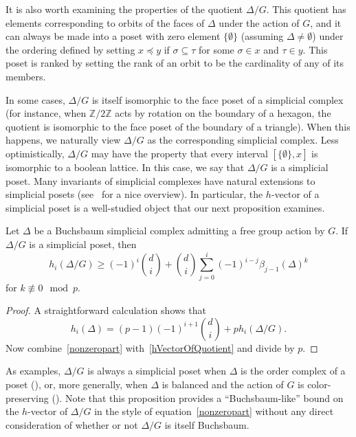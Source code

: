 \documentclass[ALCO,ThmDefs,Unicode]{cedram}
\newcommand{\ZZ}{{\mathbb Z}}
\begin{document}
It is also worth examining the properties of the quotient $\Delta/G$. This quotient has elements corresponding to orbits of the faces of $\Delta$ under the action of $G$, and it can always be made into a poset with zero element $\{\emptyset\}$ (assuming $\Delta\not=\emptyset$) under the ordering defined by setting $x\preceq y$ if $\sigma\subseteq \tau$ for some $\sigma\in x$ and $\tau\in y$. This poset is ranked by setting the rank of an orbit to be the cardinality of any of its members.

In some cases, $\Delta/G$ is itself isomorphic to the face poset of a simplicial complex (for instance, when $\ZZ/2\ZZ$ acts by rotation on the boundary of a hexagon, the quotient is isomorphic to the face poset of the boundary of a triangle). When this happens, we naturally view $\Delta/G$ as the corresponding simplicial complex. Less optimistically, $\Delta/G$ may have the property that every interval $[\{\emptyset\}, x]$ is isomorphic to a boolean lattice. In this case, we say that $\Delta/G$ is a simplicial poset. Many invariants of simplicial complexes have natural extensions to simplicial posets (see~\cite{StanleyPosets} for a nice overview). In particular, the $h$-vector of a simplicial poset is a well-studied object that our next proposition examines.

\begin{prop}
Let $\Delta$ be a Buchsbaum simplicial complex admitting a free group action by $G$. If $\Delta/G$ is a simplicial poset, then
\[
h_i(\Delta/G)\ge (-1)^i\binom{d}{i}+\binom{d}{i}\sum_{j=0}^i(-1)^{i-j}\beta_{j-1}(\Delta)^k
\]
for $k\not\equiv 0 \mod p$.
\end{prop}

\begin{proof}
A straightforward calculation shows that
\begin{equation}\label{hVectorOfQuotient}
h_i(\Delta)=(p-1)(-1)^{i+1}\binom{d}{i}+p h_i(\Delta/G).
\end{equation}
Now combine~\eqref{nonzeropart} with~\eqref{hVectorOfQuotient} and divide by $p$.
\end{proof}

As examples, $\Delta/G$ is always a simplicial poset when $\Delta$ is the order complex of a poset (\cite[Section~6]{Garsia}), or, more generally, when $\Delta$ is balanced and the action of $G$ is color-preserving (\cite{Reiner}). Note that this proposition provides a ``Buchsbaum-like'' bound on the $h$-vector of $\Delta/G$ in the style of equation~\eqref{nonzeropart} without any direct consideration of whether or not $\Delta/G$ is itself Buchsbaum.
\end{document}
